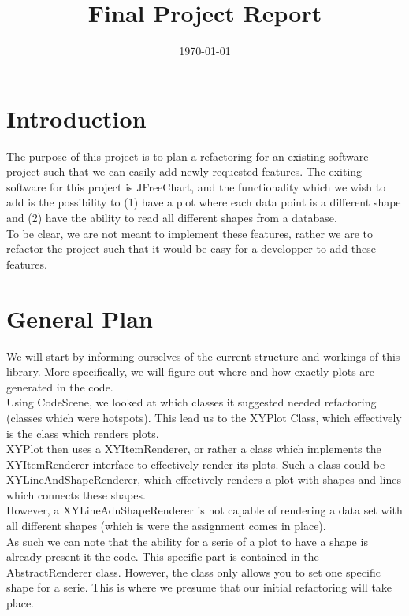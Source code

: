 \documentclass{article}
\title{\textmd{\textbf{Final Project Report}}\\\normalsize\vspace{0.1in}\Large{\projectnaam}}
\author{\student}\date{\today}
\begin{document}
\maketitle
\newpage

\section{Introduction}

The purpose of this project is to plan a refactoring for an existing software project such that we can easily add newly requested features.
The exiting software for this project is JFreeChart, and the functionality which we wish to add is the possibility to (1) have a plot where each data point is a different shape and (2) have the ability to read all different shapes from a database.\\

To be clear, we are not meant to implement these features, rather we are to refactor the project such that it would be easy for a developper to add these features.

\section{General Plan}

We will start by informing ourselves of the current structure and workings of this library. More specifically, we will figure out where and how exactly plots are generated in the code.\\

Using CodeScene, we looked at which classes it suggested needed refactoring (classes which were hotspots). This lead us to the XYPlot Class, which effectively is the class which renders plots.\\

XYPlot then uses a XYItemRenderer, or rather a class which implements the XYItemRenderer interface to effectively render its plots. Such a class could be XYLineAndShapeRenderer, which effectively renders a plot with shapes and lines which connects these shapes.\\

However, a XYLineAdnShapeRenderer is not capable of rendering a data set with all different shapes (which is were the assignment comes in place).\\

As such we can note that the ability for a serie of a plot to have a shape is already present it the code. This specific part is contained in the AbstractRenderer class. However, the class only allows you to set one specific shape for a serie. This is where we presume that our initial refactoring will take place.\\
\end{document}
